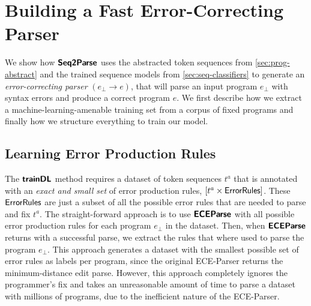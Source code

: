 \section{Building a Fast Error-Correcting Parser}
\label{sec:whole-system}

We show how $\bm{\mathsf{Seq2Parse}}$ uses the abstracted token sequences from
\autoref{sec:prog-abstract} and the trained sequence models from
\autoref{sec:seq-classifiers} to generate an \emph{error-correcting parser}
$(e_{\bot} \to e)$, that will parse an input program $e_{\bot}$ with syntax
errors and produce a correct program $e$. We first describe how we extract a
machine-learning-amenable training set from a corpus of fixed programs and
finally how we structure everything to train our model.


\subsection{Learning Error Production Rules}
\label{sec:whole-system:error-rules}

The $\bm{\mathsf{trainDL}}$ method requires a dataset of token sequences $t^a$ that is
annotated with an \emph{exact and small set} of error production rules, \ie
$[t^a \times \mathsf{ErrorRules}]$. These $\mathsf{ErrorRules}$ are just a subset of
all the possible error rules that are needed to parse and fix $t^a$. The
straight-forward approach is to use $\bm{\mathsf{ECEParse}}$ with all possible error
production rules for each program $e_{\bot}$ in the dataset. Then, when
$\bm{\mathsf{ECEParse}}$ returns with a successful parse, we extract the rules that where used
to parse the program $e_{\bot}$. This approach generates a dataset with the
smallest possible set of error rules as labels per program, since the original
ECE-Parser returns the minimum-distance edit parse. However, this approach
completely ignores the programmer's fix and takes an unreasonable amount of time
to parse a dataset with millions of programs, due to the inefficient nature of
the ECE-Parser.

